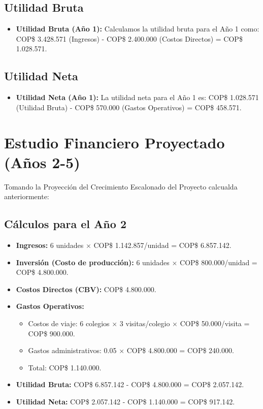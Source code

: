 \subsection*{Utilidad Bruta}

\begin{itemize}
    \item \textbf{Utilidad Bruta (Año 1):} Calculamos la utilidad bruta para el
			Año 1 como: 
			COP\$ 3.428.571 (Ingresos) - COP\$ 2.400.000 (Costos Directos) = COP\$ 1.028.571.
\end{itemize}

\subsection*{Utilidad Neta}

\begin{itemize}
    \item \textbf{Utilidad Neta (Año 1):} La utilidad neta para el Año 1 es: 
			COP\$ 1.028.571 (Utilidad Bruta) - COP\$ 570.000 (Gastos Operativos) = 
			COP\$ 458.571.
\end{itemize}

\section*{Estudio Financiero Proyectado (Años 2-5)}

Tomando la Proyección del Crecimiento Escalonado del Proyecto calcualda 
anteriormente:

\subsection*{Cálculos para el Año 2}
\begin{itemize}
    \item \textbf{Ingresos:} 6 unidades $\times$ COP\$ 1.142.857/unidad = 
			COP\$ 6.857.142.
    \item \textbf{Inversión (Costo de producción):} 
			6 unidades $\times$ COP\$ 800.000/unidad = COP\$ 4.800.000.
    \item \textbf{Costos Directos (CBV):} COP\$ 4.800.000.
    \item \textbf{Gastos Operativos:}
    \begin{itemize}
        \item Costos de viaje: 6 colegios $\times$ 3 visitas/colegio $\times$ 
					COP\$ 50.000/visita = COP\$ 900.000.
        \item Gastos administrativos: 
					0.05 $\times$ COP\$ 4.800.000 = COP\$ 240.000.
        \item Total: COP\$ 1.140.000.
    \end{itemize}
    \item \textbf{Utilidad Bruta:} COP\$ 6.857.142 - COP\$ 4.800.000 = COP\$ 2.057.142.
    \item \textbf{Utilidad Neta:} COP\$ 2.057.142 - COP\$ 1.140.000 = COP\$ 917.142.
\end{itemize}

